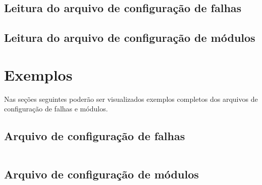 \subsection{Leitura do arquivo de configuração de falhas}

\subsection{Leitura do arquivo de configuração de módulos}

\section{Exemplos}
Nas seções seguintes poderão ser visualizados exemplos completos dos arquivos de
configuração de falhas e módulos.

\subsection{Arquivo de configuração de falhas}
\begin{listing}[H]
\inputminted[fontsize = \footnotesize,
             bgcolor = cinzaclaro,
             linenos = true,
             samepage = false ]{xml}{codigos/falhas.sdd}
\end{listing}

\subsection{Arquivo de configuração de módulos}
\begin{listing}[H]
\inputminted[fontsize = \footnotesize,
             bgcolor = cinzaclaro,
             linenos = true ]{xml}{codigos/modulos.sdd}
\end{listing}
